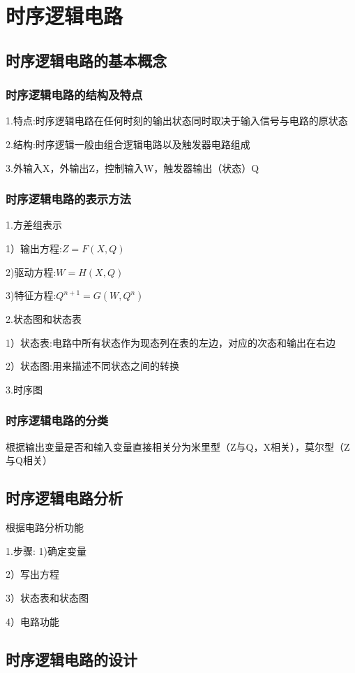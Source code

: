 \documentclass[11pt,twoside,a4paper]{ctexart}
\begin{document}
    
\section{时序逻辑电路}
\subsection{时序逻辑电路的基本概念}
\subsubsection{时序逻辑电路的结构及特点}

1.特点:时序逻辑电路在任何时刻的输出状态同时取决于输入信号与电路的原状态

2.结构:时序逻辑一般由组合逻辑电路以及触发器电路组成

3.外输入X，外输出Z，控制输入W，触发器输出（状态）Q

\subsubsection{时序逻辑电路的表示方法}

1.方差组表示

1）输出方程:$Z = F(X,Q)$

2)驱动方程:$W = H(X,Q)$

3)特征方程:$Q^{n+1} = G(W,Q^n)$

2.状态图和状态表

1）状态表:电路中所有状态作为现态列在表的左边，对应的次态和输出在右边

2）状态图:用来描述不同状态之间的转换

3.时序图

\subsubsection{时序逻辑电路的分类}

根据输出变量是否和输入变量直接相关分为米里型（Z与Q，X相关），莫尔型（Z与Q相关）

\subsection{时序逻辑电路分析}
根据电路分析功能

1.步骤:
1)确定变量

2）写出方程

3）状态表和状态图

4）电路功能

\subsection{时序逻辑电路的设计}
\end{document}
